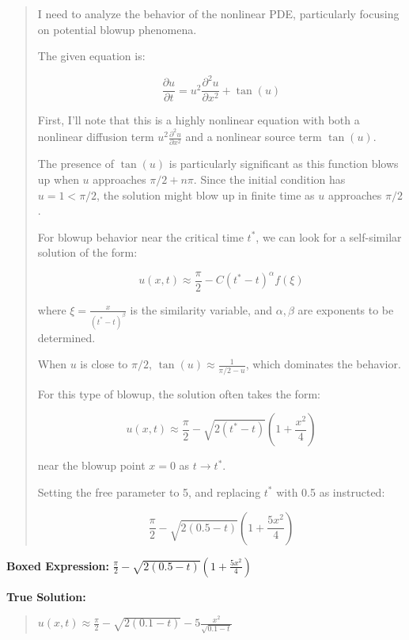 \documentclass{article}
\begin{document}
\begin{quote}
I need to analyze the behavior of the nonlinear PDE, particularly focusing on potential blowup phenomena.



The given equation is:

$$\frac{\partial u}{\partial t} = u^2 \frac{\partial^2 u}{\partial x^2} + \tan(u)$$



First, I'll note that this is a highly nonlinear equation with both a nonlinear diffusion term $u^2 \frac{\partial^2 u}{\partial x^2}$ and a nonlinear source term $\tan(u)$.



The presence of $\tan(u)$ is particularly significant as this function blows up when $u$ approaches $\pi/2 + n\pi$. Since the initial condition has $u = 1 < \pi/2$, the solution might blow up in finite time as $u$ approaches $\pi/2$.



For blowup behavior near the critical time $t^*$, we can look for a self-similar solution of the form:

$$u(x,t) \approx \frac{\pi}{2} - C(t^* - t)^\alpha f(\xi)$$



where $\xi = \frac{x}{(t^* - t)^\beta}$ is the similarity variable, and $\alpha, \beta$ are exponents to be determined.



When $u$ is close to $\pi/2$, $\tan(u) \approx \frac{1}{\pi/2 - u}$, which dominates the behavior.



For this type of blowup, the solution often takes the form:

$$u(x,t) \approx \frac{\pi}{2} - \sqrt{2(t^* - t)}(1 + \frac{x^2}{4})$$



near the blowup point $x = 0$ as $t \to t^*$.



Setting the free parameter to 5, and replacing $t^*$ with 0.5 as instructed:



$$\boxed{\frac{\pi}{2} - \sqrt{2(0.5 - t)}(1 + \frac{5x^2}{4})}$$
\end{quote}
\textbf{Boxed Expression:} $\frac{\pi}{2} - \sqrt{2(0.5 - t)}(1 + \frac{5x^2}{4})$

\textbf{True Solution:}
\begin{quote}
$u(x,t) \approx \frac{\pi}{2} - \sqrt{2(0.1-t)} - 5 \frac{x^2}{\sqrt{0.1-t}}$
\end{quote}
\end{document}
